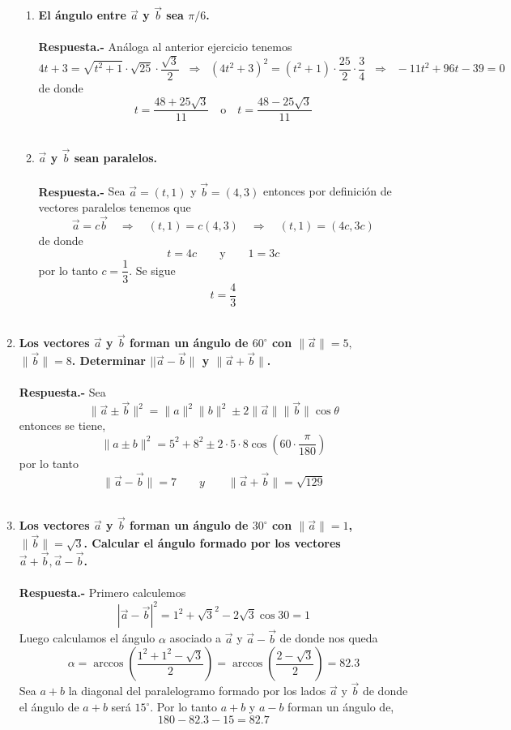 \begin{enumerate}
\begin{enumerate}[\bfseries a)]
    \item \textbf{\boldmath El ángulo entre $\vec{a}$ y $\vec{b}$ sea $\pi/6$.\\\\
	Respuesta.-}\; Análoga al anterior ejercicio tenemos $$4t+3=\sqrt{t^2+1}\cdot \sqrt{25}\cdot \dfrac{\sqrt{3}}{2}\;\; \Rightarrow \; \; (4t^2+3)^2=(t^2+1)\cdot\dfrac{25}{2}\cdot \dfrac{3}{4}\;\; \Rightarrow \; \; -11t^2+96t-39=0$$
	de donde $$t=\dfrac{48+25\sqrt{3}}{11} \quad \mbox{o} \quad t=\dfrac{48-25\sqrt{3}}{11}$$\\

    \item \textbf{\boldmath $\vec{a}$ y $\vec{b}$ sean paralelos.\\\\
	Respuesta.-}\; Sea $\vec{a}=(t,1)$ y $\vec{b}=(4,3)$ entonces por definición de vectores paralelos tenemos que $$\vec{a}=c\vec{b} \quad \Rightarrow \quad (t,1)=c(4,3) \quad \Rightarrow \quad (t,1)=(4c,3c)$$
	de donde $$t=4c \qquad \mbox{y} \qquad 1=3c$$
	por lo tanto $c=\dfrac{1}{3}$. Se sigue $$t=\dfrac{4}{3}$$\\

\end{enumerate}

\item \textbf{\boldmath Los vectores $\vec{a}$ y $\vec{b}$ forman un ángulo de $60^\circ$ con $\|\vec{a}\|=5,$ $\|\vec{b}\|=8$. Determinar $||\vec{a}-\vec{b}\|$ y $\|\vec{a}+\vec{b}\|$.\\\\
    Respuesta.-}\; Sea $$\| \vec{a}\pm\vec{b}\|^2=\|a\|^2\|b\|^2 \pm 2\|\vec{a}\|\|\vec{b}\|\cos \theta$$  
    entonces se tiene, $$\|a\pm b\|^2 = 5^2 + 8^2 \pm 2\cdot 5\cdot 8 \cos\left(60\cdot\dfrac{\pi}{180}\right)$$
    por lo tanto $$\|\vec{a}-\vec{b}\| = 7 \qquad y \qquad \|\vec{a}+\vec{b}\| = \sqrt{129}$$\\

\item \textbf{\boldmath Los vectores $\vec{a}$ y $\vec{b}$ forman un ángulo de $30^\circ$ con $\|\vec{a}\|=1$, $\|\vec{b}\|=\sqrt{3}$. Calcular el ángulo formado por los vectores $\vec{a}+\vec{b}, \vec{a}-\vec{b}$.\\\\
    Respuesta.-}\; Primero calculemos $$|\vec{a}-\vec{b}|^2 = 1^2 + \sqrt{3}^2 - 2\sqrt{3} \cos 30 = 1$$
    Luego calculamos el ángulo $\alpha$ asociado a $\vec{a}$ y $\vec{a}-\vec{b}$ de donde nos queda $$\alpha= \arccos \left(\dfrac{1^2+1^2-\sqrt{3}}{2}\right) = \arccos\left(\dfrac{2-\sqrt{3}}{2}\right) = 82\mbox{.}3$$
    Sea  $a+b$ la diagonal del paralelogramo formado por los lados $\vec{a}$ y $\vec{b}$ de donde el ángulo de $a+b$ será $15^\circ$. Por lo tanto  $a+b$ y  $a-b$ forman un ángulo de, $$180-82\mbox{.}3-15=82\mbox{.}7$$\\


\end{enumerate}
